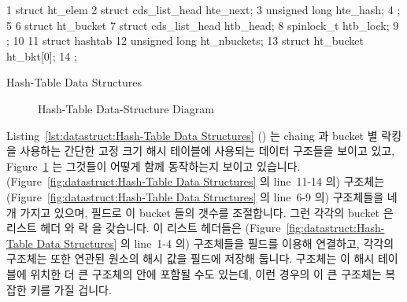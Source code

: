 \begin{listing}[tb]
{ \scriptsize
\begin{verbbox}
 1 struct ht_elem {
 2   struct cds_list_head hte_next;
 3   unsigned long hte_hash;
 4 };
 5 
 6 struct ht_bucket {
 7   struct cds_list_head htb_head;
 8   spinlock_t htb_lock;
 9 };
10 
11 struct hashtab {
12   unsigned long ht_nbuckets;
13   struct ht_bucket ht_bkt[0];
14 };
\end{verbbox}
}
\centering
\theverbbox
\caption{Hash-Table Data Structures}
\label{lst:datastruct:Hash-Table Data Structures}
\end{listing}

\begin{figure}[tb]
\centering
{}
\caption{Hash-Table Data-Structure Diagram}
\label{fig:datastruct:Hash-Table Data-Structure Diagram}
\end{figure}

Listing~\ref{lst:datastruct:Hash-Table Data Structures}
()
는 chaing 과 bucket 별 락킹을 사용하는 간단한 고정 크기 해시 테이블에 사용되는
데이터 구조들을 보이고 있고,
Figure~\ref{fig:datastruct:Hash-Table Data-Structure Diagram} 는 그것들이
어떻게 함께 동작하는지 보이고 있습니다.
(Figure~\ref{fig:datastruct:Hash-Table Data Structures} 의 line~11-14 의)
 구조체는
(Figure~\ref{fig:datastruct:Hash-Table Data Structures} 의 line~6-9 의)
 구조체들을 네개 가지고 있으며,  필드로 이
bucket 들의 갯수를 조절합니다.
그런 각각의 bucket 은 리스트 헤더  와 락  을
갖습니다.
이 리스트 헤더들은
(Figure~\ref{fig:datastruct:Hash-Table Data Structures} 의 line~1-4 의)
 구조체들을  필드를 이용해 연결하고, 각각의
 구조체는 또한 연관된 원소의 해시 값을  필드에
저장해 둡니다.
 구조체는 이 해시 테이블에 위치한 더 큰 구조체의 안에 포함될 수도
있는데, 이런 경우의 이 큰 구조체는 복잡한 키를 가질 겁니다.

